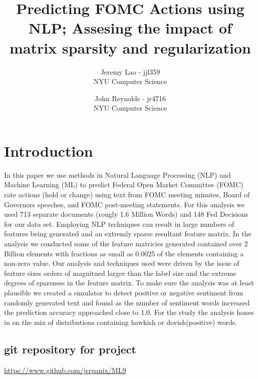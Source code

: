 \documentclass[11pt]{article}
\title{Predicting FOMC Actions using NLP; Assesing the impact of matrix sparsity and regularization}
\author{
        Jeremy Lao - jjl359 \\
        NYU Computer Science \\
            \and
        John Reynolds - jr4716 \\
        NYU Computer Science \\
}
\begin{document}
{\setlength{\mathindent}{0cm}
\maketitle


\section{Introduction}
In this paper we use methods in Natural Language Processing (NLP) and Machine Learning (ML) to predict Federal Open Market Committee (FOMC) rate actions (hold or change) using text from FOMC meeting minutes, Board of Governors speeches, and FOMC post-meeting statements.  
For this analysis we used 713 separate documents (rougly 1.6 Million Words) and 148 Fed Decisions for our data set.  
Employing NLP techniques can result in large numbers of features being generated and an extremly sparse resultant feature matrix.  
In the analysis we conducted some of the feature matricies generated contained over 2 Billion elements with fractions as small as 0.0025 of the elements containing a non-zero value.  
Our analysis and techniques used were driven by the issue of feature sizes orders of magnitued larger than the label size and the extreme degrees of sparsness in the feature matrix.  
To make sure the analysis was at least plausible we created a simulator to detect positive or negative sentiment from randomly generated text and found as the number of sentiment words increased the prediction accuracy approached close to 1.0.  
For the study the analysis hones in on the mix of distributions containing hawkish or dovish(positive) words.

\subsection{git repository for project}
\url{https://www.github.com/jrrpanix/ML9}

}
\end{document}
